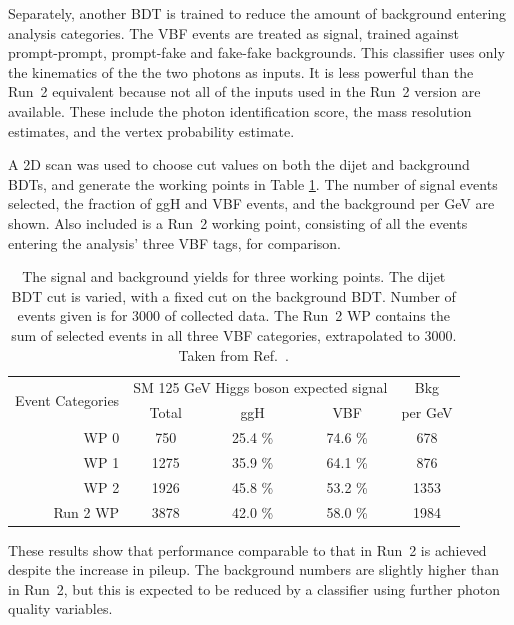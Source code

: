 Separately, another BDT is trained to reduce the amount of background entering analysis categories.
The VBF events are treated as signal, trained against prompt-prompt, prompt-fake and fake-fake \Hgg backgrounds.
This classifier uses only the kinematics of the the two photons as inputs. 
It is less powerful than the Run~2 equivalent because not all of the inputs used in the Run~2 version are available.
These include the photon identification score, the mass resolution estimates, and the vertex probability estimate.

A 2D scan was used to choose cut values on both the dijet and background BDTs, and generate the working points in Table \ref{tab:hgcal_yields}.
The number of signal events selected, the fraction of ggH and VBF events, and the background per GeV are shown.
Also included is a Run~2 working point, consisting of all the events entering the analysis' three VBF tags, for comparison.

\begin{table}
  \centering
  \begin{tabular}{ r | c |  c |  c |  c }
  \multirow{2}{*}{Event Categories} &\multicolumn{3}{c|}{SM 125 GeV Higgs boson expected signal} & Bkg \\
    &  Total & ggH & VBF & per GeV \\
  \hline
  WP 0 &    750   &  25.4 \%  &  74.6 \%  &  678  \\
  WP 1 &    1275  &  35.9 \%  &  64.1 \%  &  876  \\
  WP 2 &    1926  &  45.8 \%  &  53.2 \%  &  1353 \\
  Run 2 WP &    3878 &  42.0 \%  &  58.0 \%  &  1984 \\
  \end{tabular}
  \caption{The signal and background yields for three working points.
  The dijet BDT cut is varied, with a fixed cut on the background BDT.
  Number of events given is for \SI{3000}{\fbinv} of collected data. 
  The Run~2 WP contains the sum of selected events in all three VBF categories, extrapolated to \SI{3000}{\fbinv}.
  Taken from Ref.~\cite{HGCAL}.}
  \label{tab:hgcal_yields}
\end{table}

These results show that performance comparable to that in Run~2 is achieved despite the increase in pileup.
The background numbers are slightly higher than in Run~2, but this is expected to be reduced by a classifier using further photon quality variables.

